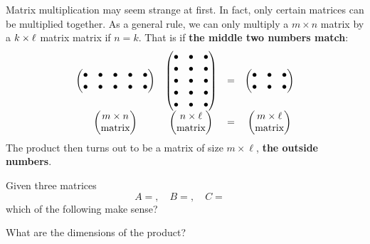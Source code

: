 \documentclass{ximera}
\begin{document}
Matrix multiplication may seem strange at first. In fact, only certain
matrices can be multiplied together. As a general rule, we can only
multiply a $m \times n$ matrix by a $k \times \ell$ matrix matrix if
$n=k$. That is if \textbf{the middle two numbers match}:
\[
\begin{matrix}
\begin{pmatrix}
    \bullet & \bullet & \bullet & \bullet & \bullet\\
    \bullet & \bullet & \bullet & \bullet & \bullet\\
\end{pmatrix}
&
\begin{pmatrix}
    \bullet & \bullet &\bullet \\\bullet & \bullet & \bullet \\  \bullet & \bullet & \bullet \\\bullet & \bullet & \bullet \\ \bullet & \bullet & \bullet \end{pmatrix} &= &
\begin{pmatrix}
  \bullet & \bullet &\bullet \\\bullet & \bullet &  \bullet
\end{pmatrix}\\
\begin{pmatrix}
  m\times n\\
  \text{matrix}
\end{pmatrix} &
\begin{pmatrix}
  n\times \ell\\
  \text{matrix}
\end{pmatrix} 
&= & \begin{pmatrix}
  m\times \ell\\
  \text{matrix}
\end{pmatrix}
\end{matrix}
\]
The product then turns out to be a matrix of size $m\times \ell$, \textbf{the
outside numbers}.

\begin{question}
  Given three matrices 
  \[
  A =,\quad B =, \quad C =\quad 
  \]
  which of the following make sense?
  \begin{selectAll}
    \pdfOnly{\end{multicols}}
  \end{selectAll}
  What are the dimensions of the product?
\end{question}
\end{document}
